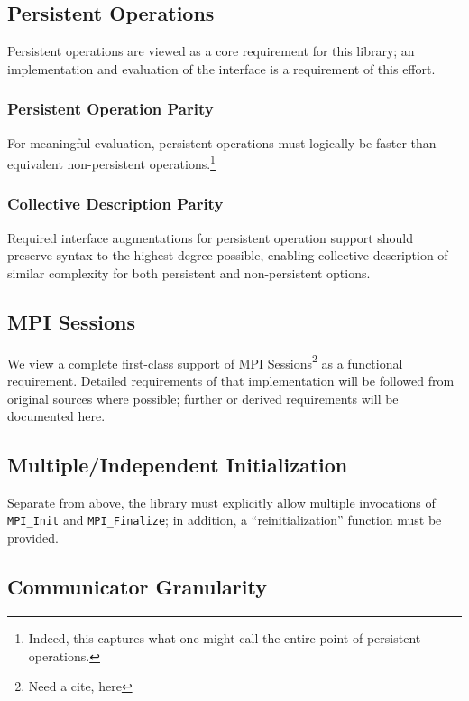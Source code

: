 \documentclass{article}
\begin{document}
\subsection{Persistent Operations}

Persistent operations are viewed as a core requirement for this library; an implementation and evaluation of the interface is a requirement of this effort.

\subsubsection{Persistent Operation Parity}

For meaningful evaluation, persistent operations must logically be faster than equivalent non-persistent operations.\footnote{Indeed, this captures what one might call the entire point of persistent operations.}

\subsubsection{Collective Description Parity}

Required interface augmentations for persistent operation support should preserve syntax to the highest degree possible, enabling collective description of similar complexity for both persistent and non-persistent options.

\subsection{MPI Sessions}

We view a complete first-class support of MPI Sessions\footnote{Need a cite, here} as a functional requirement.  Detailed requirements of that implementation will be followed from original sources where possible; further or derived requirements will be documented here.

\subsection{Multiple/Independent Initialization}

Separate from above, the library must explicitly allow multiple invocations of \texttt{MPI\_Init} and \texttt{MPI\_Finalize}; in addition, a ``reinitialization'' function must be provided.

\subsection{Communicator Granularity}
\end{document}
